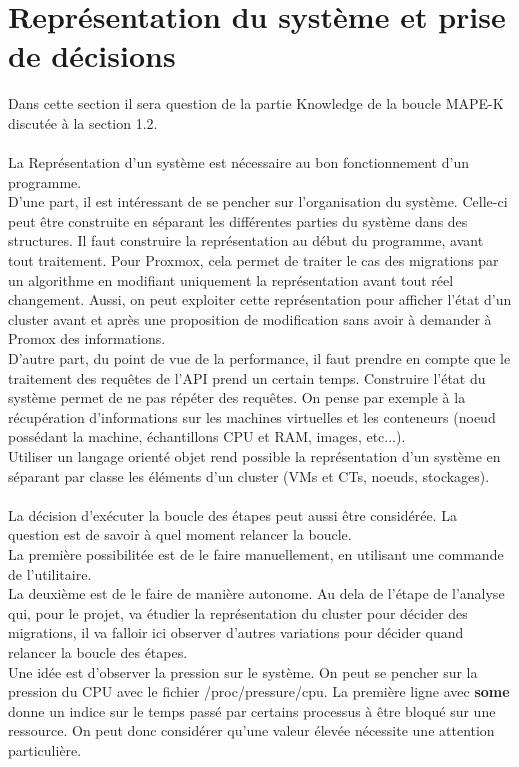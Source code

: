 \documentclass[14pt]{extarticle}
\begin{document}
\section{Représentation du système et prise de décisions}
    Dans cette section il sera question de la partie Knowledge de la boucle MAPE-K discutée à la section 1.2.\\
    \\
    La Représentation d'un système est nécessaire au bon fonctionnement d'un programme.\\
    D'une part, il est intéressant de se pencher sur l'organisation du système. Celle-ci peut être construite en séparant les différentes parties du système dans des structures. Il faut construire la représentation au début du programme, avant tout traitement. Pour Proxmox, cela permet de traiter le cas des migrations par un algorithme en modifiant uniquement la représentation avant tout réel changement. Aussi, on peut exploiter cette représentation pour afficher l'état d'un cluster avant et après une proposition de modification sans avoir à demander à Promox des informations.\\
    D'autre part, du point de vue de la performance, il faut prendre en compte que le traitement des requêtes de l'API prend un certain temps. Construire l'état du système permet de ne pas répéter des requêtes. On pense par exemple à la récupération d'informations sur les machines virtuelles et les conteneurs (noeud possédant la machine, échantillons CPU et RAM, images, etc...).\\
    Utiliser un langage orienté objet rend possible la représentation d'un système en séparant par classe les éléments d'un cluster (VMs et CTs, noeuds, stockages).\\
    \\
    La décision d'exécuter la boucle des étapes peut aussi être considérée. La question est de savoir à quel moment relancer la boucle.\\
    La première possibilitée est de le faire manuellement, en utilisant une commande de l'utilitaire.\\
    La deuxième est de le faire de manière autonome. Au dela de l'étape de l'analyse qui, pour le projet, va étudier la représentation du cluster pour décider des migrations, il va falloir ici observer d'autres variations pour décider quand relancer la boucle des étapes.\\
    Une idée est d'observer la pression sur le système. On peut se pencher sur la pression du CPU \cite{kernel_psi} avec le fichier /proc/pressure/cpu. La première ligne avec \textbf{some} donne un indice sur le temps passé par certains processus à être bloqué sur une ressource. On peut donc considérer qu'une valeur élevée nécessite une attention particulière.\\
\end{document}
